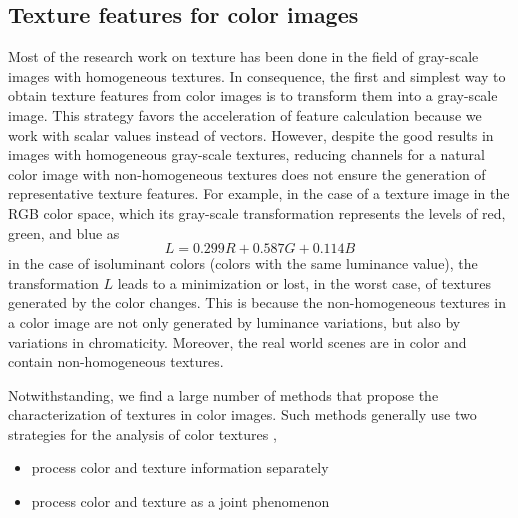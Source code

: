 \subsection{Texture features for color images}
Most of the research work on texture has been done in the field of gray-scale images with homogeneous textures. In consequence, the first and simplest way to obtain texture features from color images is to transform them into a gray-scale image. This strategy favors the acceleration of feature calculation because we work with scalar values instead of vectors. However, despite the good results in images with homogeneous gray-scale textures, reducing channels for a natural color image with non-homogeneous textures does not ensure the generation of representative texture features. For example, in the case of a texture image in the RGB color space, which its gray-scale transformation represents the levels of red, green, and blue \citep{Artusi.Banterle.ea:Book:2016} as
\begin{equation}\label{eq:color2gray_formula}
    L = 0.299 R + 0.587 G + 0.114 B    
\end{equation} 
in the case of isoluminant colors (colors with the same luminance value), the transformation $L$ leads to a minimization or lost, in the worst case, of textures generated by the color changes. This is because the non-homogeneous textures in a color image are not only generated by luminance variations, but also by variations in chromaticity. Moreover, the real world scenes are in color and contain non-homogeneous textures.


Notwithstanding, we find a large number of methods that propose the characterization of textures in color images. Such methods generally use two strategies for the analysis of color textures \citep{Maenpaa.Pietikainen:PR:2004}, \citep{Qazi.Alata.ea:PR:2011}

\begin{itemize}
	\item process color and texture information separately
	\item process color and texture as a joint phenomenon
\end{itemize} 

